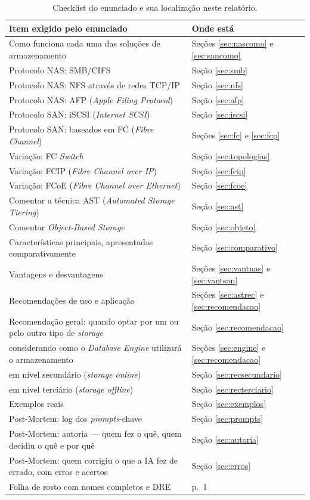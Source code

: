 \documentclass[11pt,a4paper]{article}
\begin{document}
\begin{table}[H]
\centering
\caption{Checklist do enunciado e sua localização neste relatório.}
\label{tab:checklist}
{\footnotesize
\begin{tabular}{@{}L{11.3cm}l@{}}
\toprule
\textbf{Item exigido pelo enunciado} & \textbf{Onde está} \\
\midrule
Como funciona cada uma das soluções de armazenamento & Seções \ref{sec:nascomo} e \ref{sec:sancomo} \\
Protocolo NAS: SMB/CIFS & Seção \ref{sec:smb} \\
Protocolo NAS: NFS através de redes TCP/IP & Seção \ref{sec:nfs} \\
Protocolo NAS: AFP (\textit{Apple Filing Protocol}) & Seção \ref{sec:afp} \\
Protocolo SAN: iSCSI (\textit{Internet SCSI}) & Seção \ref{sec:iscsi} \\
Protocolo SAN: baseados em FC (\textit{Fibre Channel}) & Seções \ref{sec:fc} e \ref{sec:fcp} \\
Variação: FC \textit{Switch} & Seção \ref{sec:topologias} \\
Variação: FCIP (\textit{Fibre Channel over IP}) & Seção \ref{sec:fcip} \\
Variação: FCoE (\textit{Fibre Channel over Ethernet}) & Seção \ref{sec:fcoe} \\
Comentar a técnica AST (\textit{Automated Storage Tiering}) & Seção \ref{sec:ast} \\
Comentar \textit{Object-Based Storage} & Seção \ref{sec:objeto} \\
Características principais, apresentadas comparativamente & Seção \ref{sec:comparativo} \\
Vantagens e desvantagens & Seções \ref{sec:vantnas} e \ref{sec:vantsan} \\
Recomendações de uso e aplicação & Seções \ref{sec:astrec} e \ref{sec:recomendacao} \\
Recomendação geral: quando optar por um ou pelo outro tipo de \textit{storage} & Seção \ref{sec:recomendacao} \\
\quad considerando como o \textit{Database Engine} utilizará o armazenamento & Seções \ref{sec:engine} e \ref{sec:recomendacao} \\
\quad em nível secundário (\textit{storage online}) & Seção \ref{sec:recsecundario} \\
\quad em nível terciário (\textit{storage offline}) & Seção \ref{sec:recterciario} \\
Exemplos reais & Seção \ref{sec:exemplos} \\
Post-Mortem: log dos \textit{prompts}-chave & Seção \ref{sec:prompts} \\
Post-Mortem: autoria --- quem fez o quê, quem decidiu o quê e por quê & Seção \ref{sec:autoria} \\
Post-Mortem: quem corrigiu o que a IA fez de errado, com erros e acertos & Seção \ref{sec:erros} \\
Folha de rosto com nomes completos e DRE & p.\ 1 \\
\bottomrule
\end{tabular}}
\end{table}
\end{document}

